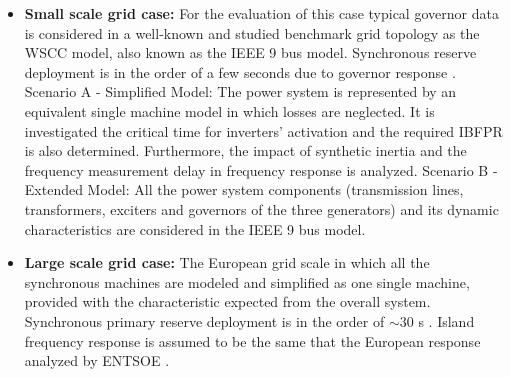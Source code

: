 \begin{itemize}[leftmargin=*,labelsep=5.8mm]
	\item \textbf{Small scale grid case:} For the evaluation of this case typical governor data is considered in a well-known and studied benchmark grid topology as the WSCC model, also known as the IEEE 9 bus model. Synchronous reserve deployment is in the order of a few seconds due to governor response \cite{kundur1994power}\cite{sundaram2008comparing}.
	\subitem Scenario A - Simplified Model: The power system is represented by an equivalent single machine model in which losses are neglected. It is investigated the critical time for inverters' activation and the required IBFPR is  also determined. Furthermore, the impact of synthetic inertia and the frequency measurement delay in frequency response is analyzed.
	\subitem Scenario B - Extended Model: All the power system components (transmission lines, transformers, exciters and governors of the three generators) and its dynamic characteristics are considered in the IEEE 9 bus model.\\
	\item \textbf{Large scale grid case:} The European grid scale in which all the synchronous machines are modeled and simplified as one single machine, provided with the characteristic expected from the overall system. Synchronous primary reserve deployment is in the order of $ \sim30 $ s \cite{ENTSOE.2016}\cite{hultholm2015optimal}. Island frequency response is assumed to be the same that the European response analyzed by ENTSOE \cite{ENTSOE.2016}.
\end{itemize}



